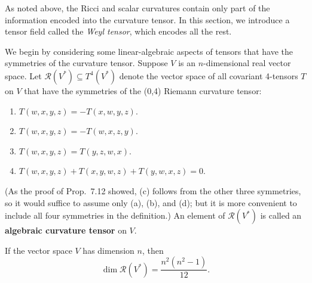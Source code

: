 As noted above, the Ricci and scalar curvatures contain only part of the information encoded into the curvature tensor. In this section, we introduce a tensor field called the \emph{Weyl tensor}, which encodes all the rest.

We begin by considering some linear-algebraic aspects of tensors that have the symmetries of the curvature tensor. Suppose $V$ is an $n$-dimensional real vector space. Let $\mathscr{R}(V^*) \subseteq T^4(V^*)$ denote the vector space of all covariant 4-tensors $T$ on $V$ that have the symmetries of the (0,4) Riemann curvature tensor:
\begin{enumerate}
\item[(a)] $T(w,x,y,z) = -T(x,w,y,z)$.
\item[(b)] $T(w,x,y,z) = -T(w,x,z,y)$.
\item[(c)] $T(w,x,y,z) = T(y,z,w,x)$.
\item[(d)] $T(w,x,y,z) + T(x,y,w,z) + T(y,w,x,z) = 0$.
\end{enumerate}
(As the proof of Prop.\ 7.12 showed, (c) follows from the other three symmetries, so it would suffice to assume only (a), (b), and (d); but it is more convenient to include all four symmetries in the definition.) An element of $\mathscr{R}(V^*)$ is called an \textbf{algebraic curvature tensor} on $V$.

\begin{proposition}
\label{prop:dim-algebraic-curvature-tensors}
If the vector space $V$ has dimension $n$, then
\begin{equation}
\dim \mathscr{R}(V^*) = \frac{n^2(n^2-1)}{12}. \tag{7.36}
\end{equation}
\end{proposition}

